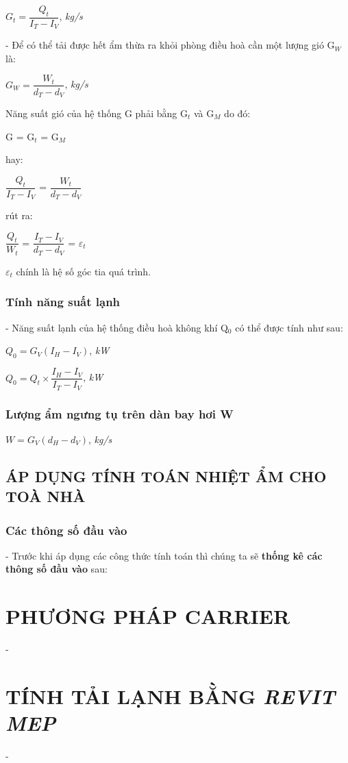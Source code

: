 \begin{center}
	$ G_{t} = \dfrac{Q_{t}}{I_{T} - I_{V}} $, \textit{kg/s}
\end{center}

- Để có thể tải được hết ẩm thừa ra khỏi phòng điều hoà cần một lượng gió G$_{W}$ là:

\begin{center}
	$ G_{W} = \dfrac{W_{t}}{d_{T} - d_{V}} $, \textit{kg/s}
\end{center}

Năng suất gió của hệ thống G phải bằng G$_{t}$ và G$_{M}$ do đó:

\begin{center}
	G = G$_{t}$ = G$_{M}$
\end{center}

hay:

\begin{center}
	$ \dfrac{Q_{t}}{I_{T} - I_{V}} $ = $\dfrac{W_{t}}{d_{T} - d_{V}} $
\end{center}

rút ra:

\begin{center}
	$ \dfrac{Q_{t}}{W_{t}} $ = $ \dfrac{I_{T} - I_{V}}{d_{T} - d_{V}} $ = {\Large $\varepsilon_{t}$}
\end{center}

{\Large $\varepsilon_{t}$} chính là hệ số góc tia quá trình.

\subsubsection{Tính năng suất lạnh}
- Năng suất lạnh của hệ thống điều hoà không khí Q$ _{0} $ có thể được tính như sau:

\begin{center}
	$Q _{0} = G_{V}(I_{H} - I_{V})$, \textit{kW}
\end{center}
\begin{center}
	$ Q _{0} = Q_{t}\times\dfrac{I_{H} - I_{V}}{I_{T} - I_{V}}$, \textit{kW}
\end{center}

\subsubsection{Lượng ẩm ngưng tụ trên dàn bay hơi W}
\begin{center}
	$W = G_{V}(d_{H}-d_{V})$, \textit{kg/s}
\end{center}

\subsection{ÁP DỤNG TÍNH TOÁN NHIỆT ẨM CHO TOÀ NHÀ}
\subsubsection{Các thông số đầu vào}
- Trước khi áp dụng các công thức tính toán thì chúng ta sẽ \textbf{thống kê các thông số đầu vào} sau:






\section{PHƯƠNG PHÁP CARRIER}
- 

\section{TÍNH TẢI LẠNH BẰNG \emph{REVIT MEP}}
- 
